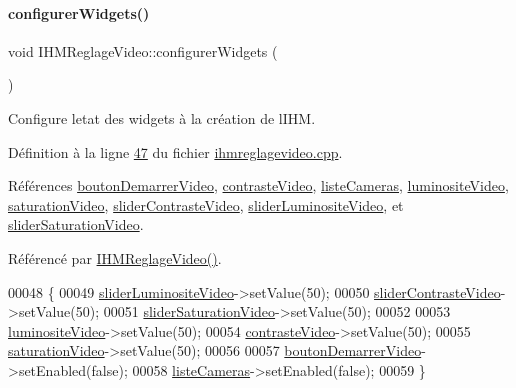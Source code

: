 \paragraph{\texorpdfstring{configurer\+Widgets()}{configurerWidgets()}}
{\footnotesize\ttfamily void I\+H\+M\+Reglage\+Video\+::configurer\+Widgets (\begin{DoxyParamCaption}{ }\end{DoxyParamCaption})\hspace{0.3cm}{\ttfamily [private]}}



Configure l\textquotesingle{}etat des widgets à la création de l\textquotesingle{}I\+HM. 



Définition à la ligne \hyperlink{ihmreglagevideo_8cpp_source_l00047}{47} du fichier \hyperlink{ihmreglagevideo_8cpp_source}{ihmreglagevideo.\+cpp}.



Références \hyperlink{ihmreglagevideo_8h_source_l00041}{bouton\+Demarrer\+Video}, \hyperlink{ihmreglagevideo_8h_source_l00035}{contraste\+Video}, \hyperlink{ihmreglagevideo_8h_source_l00038}{liste\+Cameras}, \hyperlink{ihmreglagevideo_8h_source_l00034}{luminosite\+Video}, \hyperlink{ihmreglagevideo_8h_source_l00036}{saturation\+Video}, \hyperlink{ihmreglagevideo_8h_source_l00029}{slider\+Contraste\+Video}, \hyperlink{ihmreglagevideo_8h_source_l00028}{slider\+Luminosite\+Video}, et \hyperlink{ihmreglagevideo_8h_source_l00030}{slider\+Saturation\+Video}.



Référencé par \hyperlink{ihmreglagevideo_8cpp_source_l00009}{I\+H\+M\+Reglage\+Video()}.


\begin{DoxyCode}
00048 \{
00049     \hyperlink{class_i_h_m_reglage_video_a333b7f1b3239abd5823e0b0f2857716b}{sliderLuminositeVideo}->setValue(50);
00050     \hyperlink{class_i_h_m_reglage_video_a69917b4179132a63efe6c3fb63ba666a}{sliderContrasteVideo}->setValue(50);
00051     \hyperlink{class_i_h_m_reglage_video_aba60de0eccec35f165101b10c0cd33df}{sliderSaturationVideo}->setValue(50);
00052 
00053     \hyperlink{class_i_h_m_reglage_video_a9109c0801d582917e78e57c350510ea7}{luminositeVideo}->setValue(50);
00054     \hyperlink{class_i_h_m_reglage_video_a617e9dbd5a92c35e7e351228354deb63}{contrasteVideo}->setValue(50);
00055     \hyperlink{class_i_h_m_reglage_video_a058bd2a65aefa5f95ff73851f156064c}{saturationVideo}->setValue(50);
00056 
00057     \hyperlink{class_i_h_m_reglage_video_a98d33390551ab92165f192be44f6361d}{boutonDemarrerVideo}->setEnabled(\textcolor{keyword}{false});
00058     \hyperlink{class_i_h_m_reglage_video_a38a35548ddd0e5750917305ac6f32142}{listeCameras}->setEnabled(\textcolor{keyword}{false});
00059 \}
\end{DoxyCode}
\mbox{\label{class_i_h_m_reglage_video_a4576b1b6ccfcabf6b2b39d37db2dd248}} 
